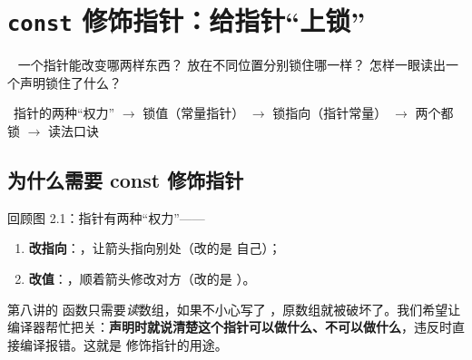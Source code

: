 
\section{\texorpdfstring{\texttt{const} 修饰指针：给指针“上锁”}{const 修饰指针：给指针上锁}}\label{sec:const}
\  一个指针能改变哪两样东西？  放在不同位置分别锁住哪一样？ 怎样一眼读出一个声明锁住了什么？\par
{}\ 指针的两种“权力” $\to$ 锁值（常量指针） $\to$ 锁指向（指针常量） $\to$ 两个都锁 $\to$ 读法口诀

\subsection{为什么需要 const 修饰指针}
回顾图 2.1：指针有两种“权力”——
\begin{enumerate}[label=(\roman*)]
  \item \textbf{改指向}：，让箭头指向别处（改的是  自己）；
  \item \textbf{改值}：，顺着箭头修改对方（改的是 ）。
\end{enumerate}
第八讲的  函数只需要\emph{读}数组，如果不小心写了 ，原数组就被破坏了。我们希望让编译器帮忙把关：\textbf{声明时就说清楚这个指针可以做什么、不可以做什么}，违反时直接编译报错。这就是  修饰指针的用途。

